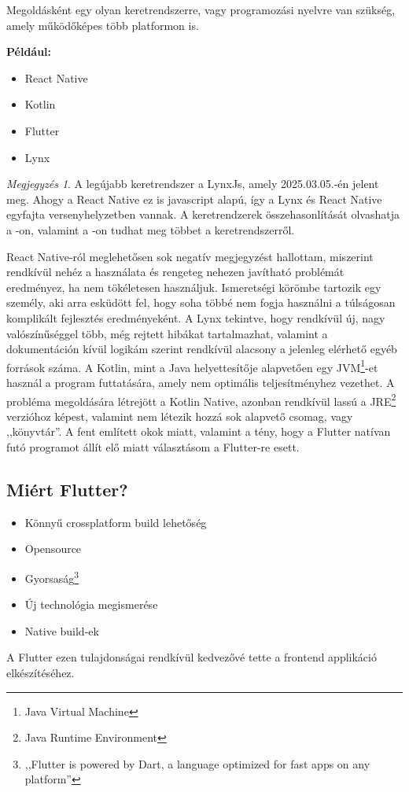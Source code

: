 \documentclass{thesis-ekf}
\theoremstyle{definition}
\theoremstyle{remark}
\newtheorem{megjegyzes}{Megjegyzés}
\begin{document}
	Megoldásként egy olyan keretrendszerre, vagy programozási nyelvre van szükség, amely működőképes több platformon is.
	
	\textbf{Például:}
	\begin{itemize}
		\item React Native
		\item Kotlin
		\item Flutter
		\item Lynx
	\end{itemize}
	\begin{megjegyzes}
		A legújabb keretrendszer a LynxJs, amely 2025.03.05.-én jelent meg. Ahogy a React Native ez is javascript alapú, így a Lynx és React Native egyfajta versenyhelyzetben vannak. A keretrendzerek összehasonlítását olvashatja a  \href{https://medium.com/@mostsignificant/introducing-lynx-how-tiktoks-new-framework-compares-to-react-native-580a52d3462c}{\color{blue}{Medium.com}}-on, valamint a \href{https://lynxjs.org/}{\color{blue}{LynxJs.org}}-on tudhat meg többet a keretrendszerről.
	\end{megjegyzes}
	
	React Native-ról meglehetősen sok negatív megjegyzést hallottam, miszerint rendkívül nehéz a használata és rengeteg nehezen javítható problémát eredményez, ha nem tökéletesen használjuk. Ismeretségi körömbe tartozik egy személy, aki arra esküdött fel, hogy soha többé nem fogja használni a túlságosan komplikált fejlesztés eredményeként.
	A Lynx tekintve, hogy rendkívül új, nagy valószínűséggel több, még rejtett hibákat tartalmazhat, valamint a dokumentáción kívül logikám szerint rendkívül alacsony a jelenleg elérhető egyéb források száma.
	A Kotlin, mint a Java helyettesítője alapvetően egy JVM\footnote{Java Virtual Machine}-et használ a program futtatására, amely nem optimális teljesítményhez vezethet. A probléma megoldására létrejött a Kotlin Native\cite{bib_kotlin_native_home}, azonban rendkívül lassú a JRE\footnote{Java Runtime Environment} verzióhoz képest, valamint nem létezik hozzá sok alapvető csomag, vagy ,,könyvtár''\cite{bib_kotlin_native_discussion}.
	A fent említett okok miatt, valamint a tény, hogy a Flutter natívan futó programot állít elő miatt választásom a Flutter-re esett.
	\subsection{Miért Flutter?}
	\begin{itemize}
		\item Könnyű crossplatform build lehetőség
		\item Opensource
		\item Gyorsaság\footnote{,,Flutter is powered by Dart, a language optimized for fast apps on any platform''\cite{bib_flutter_web}}
		\item Új technológia megismerése
		\item Native build-ek
	\end{itemize}
	A Flutter ezen tulajdonságai rendkívül kedvezővé tette a frontend applikáció elkészítéséhez. 
\end{document}
